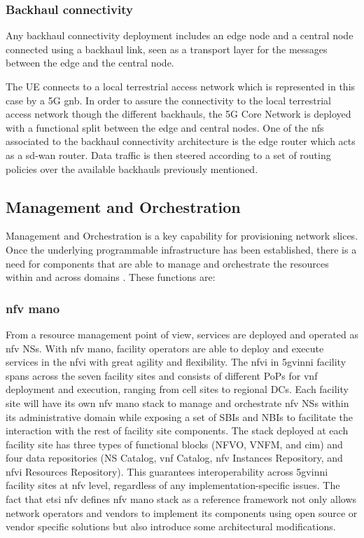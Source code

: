         \subsubsection{Backhaul connectivity}
        Any backhaul connectivity deployment includes an edge node and a central node connected using a backhaul link, seen as a transport layer for the messages between the edge and the central node.
        
        The UE connects to a local terrestrial access network which is represented in this case by a 5G \acrshort{gnb}. In order to assure the connectivity to the local terrestrial access network though the different backhauls, the 5G Core Network is deployed with a functional split between the edge and central nodes.
        One of the \acrshort{nf}s associated to the backhaul connectivity architecture is the edge router which acts as a \acrfull{sd-wan} router. Data traffic is then steered according to a set of routing policies over the available backhauls previously mentioned.
        
    \subsection{Management and Orchestration}
    Management and Orchestration is a key capability for provisioning network slices. Once the underlying programmable infrastructure has been established, there is a need for components that are able to manage and orchestrate the resources within and across domains \cite{view_5g_architecture}. These functions are:
    
        \subsubsection{\acrshort{nfv} \acrshort{mano}}
        From a resource management point of view, services are deployed and operated as \acrshort{nfv} NSs. With \acrshort{nfv} \acrshort{mano}, facility operators are able to deploy and execute services in the \acrshort{nfvi} with great agility and flexibility. The \acrshort{nfvi} in \acrshort{5gvinni} facility spans across the seven facility sites and consists of different PoPs for \acrshort{vnf} deployment and execution, ranging from cell sites to regional DCs. 
        Each facility site will have its own \acrshort{nfv} \acrshort{mano} stack to manage and orchestrate \acrshort{nfv} NSs within its administrative domain while exposing a set of SBIs and NBIs to facilitate the interaction with the rest of facility site components. 
        The stack deployed at each facility site has three types of functional blocks (NFVO, VNFM, and \acrshort{cim}) and four data repositories (NS Catalog, \acrshort{vnf} Catalog, \acrshort{nfv} Instances Repository, and \acrshort{nfvi} Resources Repository). This guarantees interoperability across \acrshort{5gvinni} facility sites at \acrshort{nfv} level, regardless of any implementation-specific issues. The fact that \acrshort{etsi} \acrshort{nfv} defines \acrshort{nfv} \acrshort{mano} stack as a reference framework not only allows network operators and vendors to implement its components using open source or vendor specific solutions but also introduce some architectural modifications.
        
